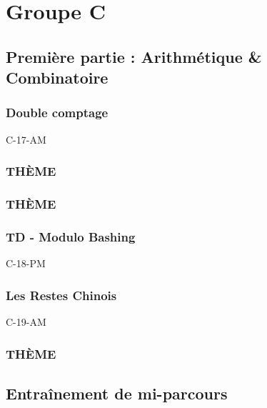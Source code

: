 \documentclass[poly,trombi]{valbonne}
\begin{document}
\chapter{Groupe C}

\minitoc \clearpage

\section{Première partie : Arithmétique \& Combinatoire}

\subsection{Double comptage}

{C-17-AM}

\subsection{THÈME}


\subsection{THÈME}


\subsection{TD - Modulo Bashing}

{C-18-PM}

\subsection{Les Restes Chinois}

{C-19-AM}

\subsection{THÈME}





\section{Entraînement de mi-parcours}
\end{document}
